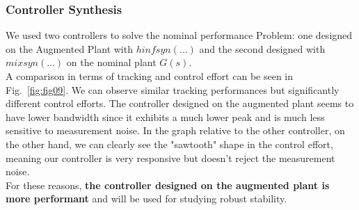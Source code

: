 \documentclass[a4paper, 12pt]{article}
\begin{document}
\subsubsection{Controller Synthesis}
We used two controllers to solve the nominal performance Problem: one designed on the Augmented Plant with $hinfsyn(\dots)$ and the second designed with $mixsyn(\dots)$ on the nominal plant $G(s)$.
\\
A comparison in terms of tracking and control effort can be seen in Fig.~\ref{fig:fig09}. We can observe similar tracking performances but significantly different control efforts. The controller designed on the augmented plant seems to have lower bandwidth since it exhibits a much lower peak and is much less sensitive to measurement noise. In the graph relative to the other controller, on the other hand, we can clearly see the "sawtooth" shape in the control effort, meaning our controller is very responsive but doesn't reject the measurement noise.
\\For these reasons, \textbf{the controller designed on the augmented plant is more performant} and will be used for studying robust stability.
\clearpage
\end{document}
